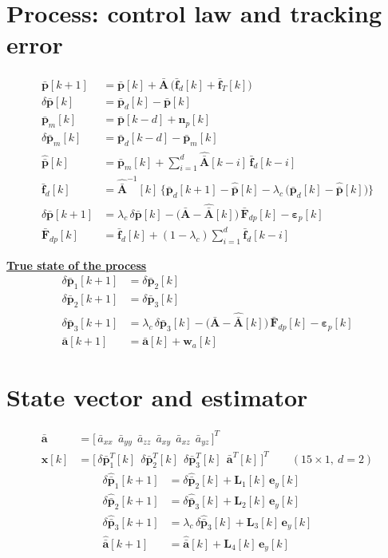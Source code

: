 \documentclass[11pt,a4paper]{ctexart}
\newcommand{\hd}[1]{\par\bigskip\noindent\underline{\textbf{#1}}}
\newcommand{\lc}{\lambda_c}
\newcommand{\bp}{\bar{\mathbf p}}
\newcommand{\dpb}{\delta\bar{\mathbf p}}
\newcommand{\dph}{\delta\hat{\bar{\mathbf p}}}
\newcommand{\Ab}{\bar{\mathbf A}}
\newcommand{\Ah}{\hat{\bar{\mathbf A}}}
\newcommand{\av}{\bar{\mathbf a}}
\newcommand{\avh}{\hat{\bar{\mathbf a}}}
\newcommand{\Fd}{\bar{\mathbf F}_{dp}}
\newcommand{\epp}{\boldsymbol\varepsilon_p}
\begin{document}
\clearpage
\section{Process: control law and tracking error}
\begin{align*}
\bp[k+1] &= \bp[k] + \Ab\,\big(\bar{\mathbf f}_d[k] + \bar{\mathbf f}_T[k]\big) \\
\dpb[k] &= \bp_d[k] - \bp[k] \\
\bp_m[k] &= \bp[k-d] + \mathbf n_p[k] \\
\dpb_m[k] &= \bp_d[k-d] - \bp_m[k] \\
\hat{\bp}[k] &= \bp_m[k] + \sum_{i=1}^{d} \Ah[k-i]\,\bar{\mathbf f}_d[k-i] \\
\bar{\mathbf f}_d[k] &= \Ah^{-1}[k]\,\Big\{\bp_d[k+1] - \hat{\bp}[k] - \lc\,\big(\bp_d[k] - \hat{\bp}[k]\big)\Big\} \\
\dpb[k+1] &= \lc\,\dpb[k] - \big(\Ab - \Ah[k]\big)\,\Fd[k] - \epp[k] \\
\Fd[k] &= \bar{\mathbf f}_d[k] + (1-\lc)\sum_{i=1}^{d} \bar{\mathbf f}_d[k-i]
\end{align*}

\hd{True state of the process}
\begin{align*}
\dpb_1[k+1] &= \dpb_2[k] \\
\dpb_2[k+1] &= \dpb_3[k] \\
\dpb_3[k+1] &= \lc\,\dpb_3[k] - \big(\Ab - \Ah[k]\big)\,\Fd[k] - \epp[k] \\
\av[k+1] &= \av[k] + \mathbf w_a[k]
\end{align*}

\section{State vector and estimator}
\begin{align*}
\av &= \big[\,\bar a_{xx}\ \ \bar a_{yy}\ \ \bar a_{zz}\ \ \bar a_{xy}\ \ \bar a_{xz}\ \ \bar a_{yz}\,\big]^{T} \\
\mathbf x[k] &= \big[\,\dpb_1^{T}[k]\ \ \dpb_2^{T}[k]\ \ \dpb_3^{T}[k]\ \ \av^{T}[k]\,\big]^{T} \qquad (15 \times 1,\ d = 2)
\end{align*}
\begin{align*}
\dph_1[k+1] &= \dph_2[k] + \mathbf L_1[k]\,\mathbf e_y[k] \\
\dph_2[k+1] &= \dph_3[k] + \mathbf L_2[k]\,\mathbf e_y[k] \\
\dph_3[k+1] &= \lc\,\dph_3[k] + \mathbf L_3[k]\,\mathbf e_y[k] \\
\avh[k+1] &= \avh[k] + \mathbf L_4[k]\,\mathbf e_y[k]
\end{align*}
\end{document}
